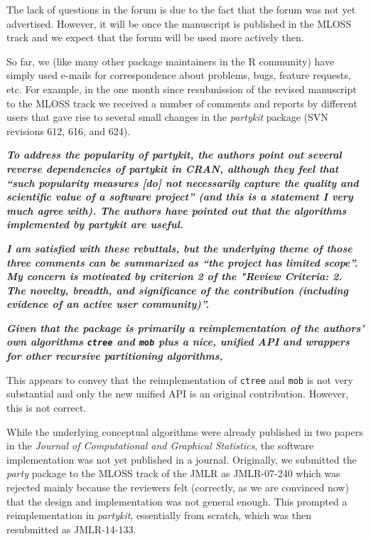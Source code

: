 \documentclass{article}
\begin{document}
\smallskip

The lack of questions in the forum is due to the fact that the forum was not yet
advertised. However, it will be once the manuscript is published in the MLOSS
track and we expect that the forum will be used more actively then.

So far, we (like many other package maintainers in the \textsf{R} community)
have simply used e-mails for correspondence about problems, bugs, feature requests, etc.
For example, in the one month since resubmission of the revised manuscript to the
MLOSS track we received a number of comments and reports by different
users that gave rise to several small changes in the \emph{partykit} package (SVN
revisions 612, 616, and 624).

\smallskip

\textbf{\textit{%
To address the popularity of partykit, the
authors point out several reverse dependencies of partykit in CRAN, although
they feel that ``such popularity measures [do] not necessarily capture the
quality and scientific value of a software project'' (and this is a statement
I very much agree with).  The authors have pointed out that the algorithms
implemented by partykit are useful.}}

\textbf{\textit{%
I am satisfied with these rebuttals, but the underlying theme of those three
comments can be summarized as ``the project has limited scope''.  My concern
is motivated by criterion 2 of the "Review Criteria: 2. The novelty, breadth,
and significance of the contribution (including evidence of an active user
community)''.}}

\textbf{\textit{%
Given that the package is primarily a reimplementation of the authors' own
algorithms \texttt{ctree} and \texttt{mob} plus a nice, unified API and wrappers for other
recursive partitioning algorithms,}}

\smallskip

This appears to convey that the reimplementation of \texttt{ctree} and \texttt{mob}
is not very substantial and only the new unified API is an original contribution.
However, this is not correct.

While the underlying conceptual algorithms were already published in two papers
in the \emph{Journal of Computational and Graphical Statistics}, the software
implementation was not yet published in a journal. Originally, we submitted the
\emph{party} package to the MLOSS track of the JMLR as JMLR-07-240 which was rejected
mainly because the reviewers felt (correctly, as we are convinced now) that the design and
implementation was not general enough. This prompted a reimplementation in \emph{partykit},
essentially from scratch, which was then resubmitted as JMLR-14-133.
\end{document}
